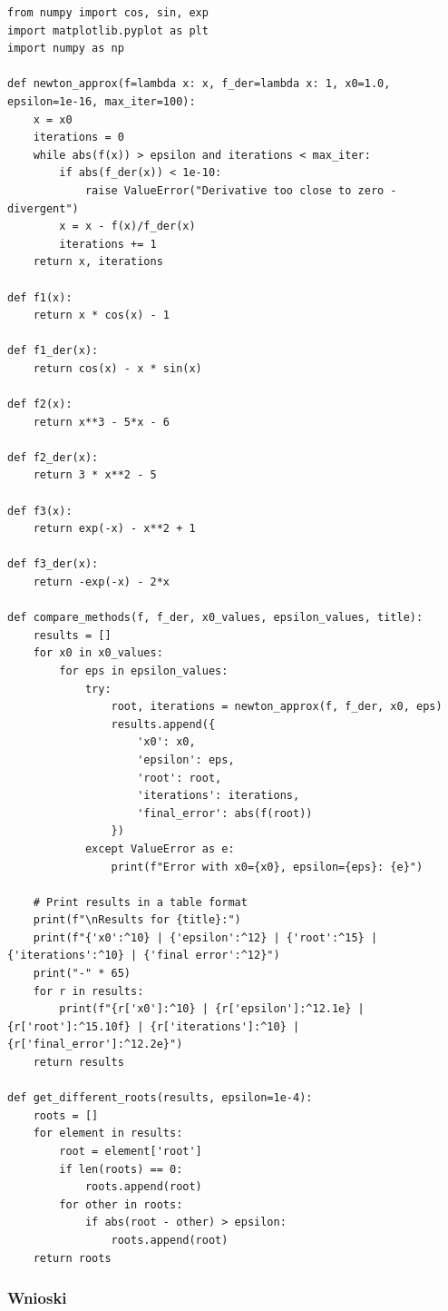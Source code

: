 \documentclass[a4paper,12pt]{article}
\begin{document}
\begin{lstlisting}
from numpy import cos, sin, exp
import matplotlib.pyplot as plt
import numpy as np

def newton_approx(f=lambda x: x, f_der=lambda x: 1, x0=1.0, epsilon=1e-16, max_iter=100):
    x = x0
    iterations = 0
    while abs(f(x)) > epsilon and iterations < max_iter:
        if abs(f_der(x)) < 1e-10:
            raise ValueError("Derivative too close to zero - divergent")
        x = x - f(x)/f_der(x)
        iterations += 1
    return x, iterations

def f1(x):
    return x * cos(x) - 1

def f1_der(x):
    return cos(x) - x * sin(x)

def f2(x):
    return x**3 - 5*x - 6

def f2_der(x):
    return 3 * x**2 - 5

def f3(x):
    return exp(-x) - x**2 + 1

def f3_der(x):
    return -exp(-x) - 2*x

def compare_methods(f, f_der, x0_values, epsilon_values, title):
    results = []
    for x0 in x0_values:
        for eps in epsilon_values:
            try:
                root, iterations = newton_approx(f, f_der, x0, eps)
                results.append({
                    'x0': x0,
                    'epsilon': eps,
                    'root': root,
                    'iterations': iterations,
                    'final_error': abs(f(root))
                })
            except ValueError as e:
                print(f"Error with x0={x0}, epsilon={eps}: {e}")

    # Print results in a table format
    print(f"\nResults for {title}:")
    print(f"{'x0':^10} | {'epsilon':^12} | {'root':^15} | {'iterations':^10} | {'final error':^12}")
    print("-" * 65)
    for r in results:
        print(f"{r['x0']:^10} | {r['epsilon']:^12.1e} | {r['root']:^15.10f} | {r['iterations']:^10} | {r['final_error']:^12.2e}")
    return results

def get_different_roots(results, epsilon=1e-4):
    roots = [] 
    for element in results:
        root = element['root']
        if len(roots) == 0:
            roots.append(root)
        for other in roots:
            if abs(root - other) > epsilon:
                roots.append(root)
    return roots
\end{lstlisting}

\subsubsection{Wnioski}
\end{document}
